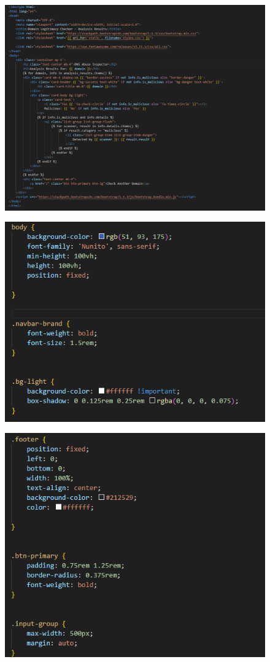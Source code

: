 \begin{figure}[h]
    \centering
    \includegraphics[width=0.8\linewidth]{appendix/a2.png}
    \label{fig:enter-label}
\end{figure}
\begin{figure}[h]
    \centering
    \includegraphics[width=0.8\linewidth]{appendix/a34.png}
    \label{fig:enter-label}
\end{figure}
\begin{figure}[h]
    \centering
    \includegraphics[width=0.8\linewidth]{appendix/a4.png}
    \label{fig:enter-label}
\end{figure}

